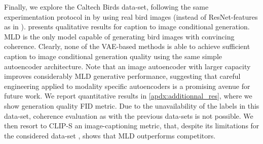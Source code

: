 Finally, we explore the Caltech Birds \textbf{\cub} \citep{mmvaeShi2019} data-set, following the same experimentation protocol in \cite{Daunhawer2021} by using real bird images (instead of ResNet-features as in \cite{mmvaeShi2019}).   presents qualitative results for caption to image conditional generation. 
\gls{MLD} is the only model capable of generating bird images with convincing coherence. Clearly, none of the \gls{VAE}-based methods is able to achieve sufficient caption to image conditional generation quality using the same simple autoencoder architecture. Note that an image autoencoder with larger capacity improves considerably \gls{MLD} generative performance, suggesting that careful engineering applied to modality specific autoencoders is a promising avenue for future work.
We report quantitative results in \ref{apdx:additionnal_res}, where we show generation quality \gls{FID} metric. Due to the unavailability of the labels in this data-set, coherence evaluation as with the previous data-sets is not possible. We then resort to \gls{CLIP-S} \cite{hessel2021clipscore} an image-captioning metric, that, despite its limitations for the considered data-set \cite{kim2022mutual}, shows that \gls{MLD} outperforms competitors.


